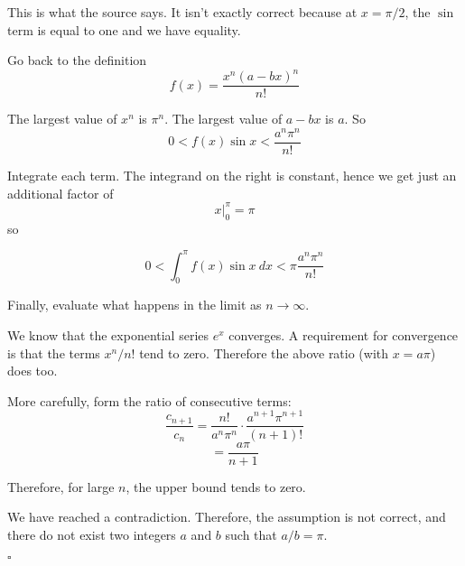 \documentclass[11pt, oneside]{article}
\begin{document}
This is what the source says.  It isn't exactly correct because at $x = \pi/2$, the $\sin$ term is equal to one and we have equality.

Go back to the definition
\[ f(x) = \frac{x^n (a - bx)^n}{n!} \]

The largest value of $x^n$ is $\pi^n$.  The largest value of $a - bx$ is $a$.  So
\[ 0 < f(x) \sin x < \frac{a^n \pi^n}{n!}  \]

Integrate each term.  The integrand on the right is constant, hence we get just an additional factor of
\[ x \bigg |_0^{\pi} = \pi \]
so

\[ 0 < \int_0^{\pi} f(x) \sin x \ dx <  \pi \frac{a^n \pi^{n}}{n!}   \]

Finally, evaluate what happens in the limit as $n \rightarrow \infty$.

We know that the exponential series $e^x$ converges.  A requirement for convergence is that the terms $x^n/n!$ tend to zero.  Therefore the above ratio (with $x = a\pi$) does too.

More carefully, form the ratio of consecutive terms:
\[ \frac{c_{n+1}}{c_n} = \frac{n!}{a^n \pi^{n}} \cdot \frac{a^{n+1} \pi^{n+1}}{(n+1)!} \]
\[ = \frac{a \pi}{n+1} \]

Therefore, for large $n$, the upper bound tends to zero.

We have reached a contradiction.  Therefore, the assumption is not correct, and there do not exist two integers $a$ and $b$ such that $a/b = \pi$.

$\square$
\end{document}
